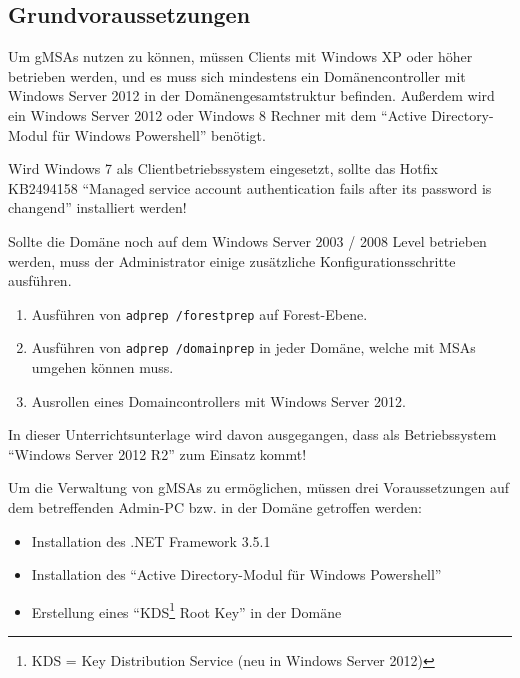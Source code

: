       \subsection{Grundvoraussetzungen}
        Um gMSAs nutzen zu können, müssen Clients mit Windows XP oder höher
        betrieben werden, und es muss sich mindestens ein Domänencontroller mit
        Windows Server 2012 in der Domänengesamtstruktur befinden. Außerdem
        wird ein Windows Server 2012 oder Windows 8 Rechner mit dem
        \enquote{Active Directory-Modul für Windows Powershell} benötigt.
        \begin{merke}
          Wird Windows 7 als Clientbetriebssystem eingesetzt, sollte das
          Hotfix KB2494158 \enquote{Managed service account authentication fails
          after its password is changend} installiert werden!
        \end{merke}
        Sollte die Domäne noch auf dem Windows Server 2003 / 2008 Level betrieben
        werden, muss der Administrator einige zusätzliche Konfigurationsschritte
        ausführen.
        \begin{enumerate}
            \item Ausführen von \texttt{adprep /forestprep} auf Forest-Ebene.
            \item Ausführen von \texttt{adprep /domainprep} in jeder Domäne,
            welche mit MSAs umgehen können muss.
            \item Ausrollen eines Domaincontrollers mit Windows Server 2012.
        \end{enumerate}
        \begin{merke}
          In dieser Unterrichtsunterlage wird davon ausgegangen, dass als
          Betriebssystem \enquote{Windows Server 2012 R2} zum Einsatz kommt!
        \end{merke}
        Um die Verwaltung von gMSAs zu ermöglichen, müssen drei Voraussetzungen
        auf dem betreffenden Admin-PC bzw. in der Domäne getroffen werden:
        \begin{itemize}
            \item Installation des .NET Framework 3.5.1
            \item Installation des \enquote{Active Directory-Modul für Windows
            Powershell}
            \item Erstellung eines \enquote{KDS\footnote{KDS = Key Distribution
            Service (neu in Windows Server 2012)} Root Key} in der Domäne
        \end{itemize}
